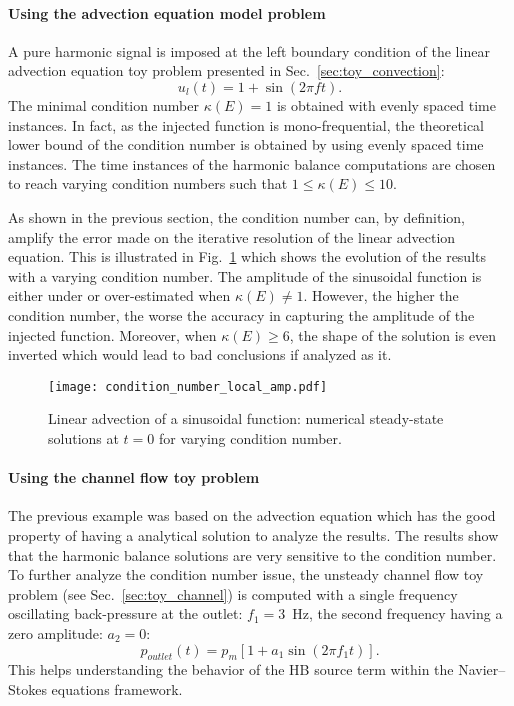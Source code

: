 \paragraph{Using the advection equation model problem}

A pure harmonic signal is imposed at the left boundary condition
of the linear advection equation toy problem presented in Sec.~\ref{sec:toy_convection}:
\begin{equation}
   u_l (t) = 1 + \sin \left(2 \pi f t\right).
\end{equation}
The minimal condition number
$\kappa(E) = 1$ is obtained with evenly spaced time instances.
In fact, as the injected function is mono-frequential, 
the theoretical lower bound of the condition number is obtained by using evenly
spaced time instances.
The time instances of the harmonic balance
computations are chosen to reach varying condition numbers
such that $1 \leq \kappa (E) \leq 10$.  

As shown in the previous section, the condition number 
can, by definition, amplify the error made
on the iterative resolution of the linear advection equation.
This is illustrated in Fig.~\ref{fig:condition_number_local_amp} which 
shows the evolution of the results with a varying condition number.
The amplitude of the
sinusoidal function is either under or over-estimated when
$\kappa (E) \neq 1$. However, 
the higher the condition number, the worse the accuracy in capturing
the amplitude of the injected function. Moreover, when $\kappa(E) \geq 6$,
the shape of the solution is even inverted which would lead to
bad conclusions if analyzed as it.
\begin{figure}[htp]
  \centering
  \texttt{[image: condition\_number\_local\_amp.pdf]}
  \caption{Linear advection of a sinusoidal function: numerical steady-state 
  solutions at $t=0$ for varying condition number.}
  \label{fig:condition_number_local_amp}
\end{figure}

\paragraph{Using the channel flow toy problem}
The previous example was based on the advection equation which
has the good property of having a analytical solution to 
analyze the results. The results show that the harmonic
balance solutions are very sensitive to the condition number.
To further analyze the condition number issue,
the unsteady channel flow toy problem
(see Sec.~\ref{sec:toy_channel}) is computed with a single
frequency oscillating back-pressure 
at the outlet: $f_1 = 3$~Hz, the second
frequency having a zero amplitude: $a_2= 0$:
\begin{equation}
   p_{outlet} (t) = p_m \left[ 1 + a_1 \sin \left(2 \pi f_1 t\right) \right].
\end{equation}
This helps understanding the behavior of the HB source term
within the Navier--Stokes equations framework.

